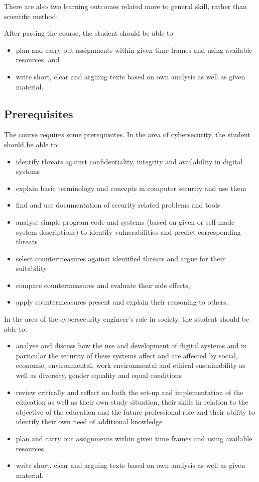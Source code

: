 There are also two learning outcomes related more to general skill, rather than 
scientific method:
\begin{frame}[fragile]
  After passing the course, the student should be able to
  \begin{itemize}
    \item plan and carry out assignments within given time frames and using 
      available resources, and
    \item write short, clear and arguing texts based on own analysis as well as 
      given material.
  \end{itemize}
\end{frame}

\subsection<article>{Prerequisites}

The course requires some prerequisites.
In the area of cybersecurity, the student should be able to:
\begin{itemize}
  \item identify threats against confidentiality, integrity and availability in 
    digital systems
  \item explain basic terminology and concepts in computer security and use 
    them
  \item find and use documentation of security related problems and tools
  \item analyse simple program code and systems (based on given or self-made 
    system descriptions) to identify vulnerabilities and predict corresponding 
    threats
  \item select countermeasures against identified threats and argue for their 
    suitability
  \item compare countermeasures and evaluate their side effects,
  \item apply countermeasures present and explain their reasoning to others.
\end{itemize}

In the area of the cybersecurity engineer's role in society, the student should 
be able to:
\begin{itemize}
  \item analyse and discuss how the use and development of digital systems and 
    in particular the security of these systems affect and are affected by 
    social, economic, environmental, work environmental and ethical 
    sustainability as well as diversity, gender equality and equal conditions
  \item review critically and reflect on both the set-up and implementation of 
    the education as well as their own study situation, their skills in 
    relation to the objective of the education and the future professional role 
    and their ability to identify their own need of additional knowledge
  \item plan and carry out assignments within given time frames and using 
    available resources
  \item write short, clear and arguing texts based on own analysis as well as 
    given material.
\end{itemize}

